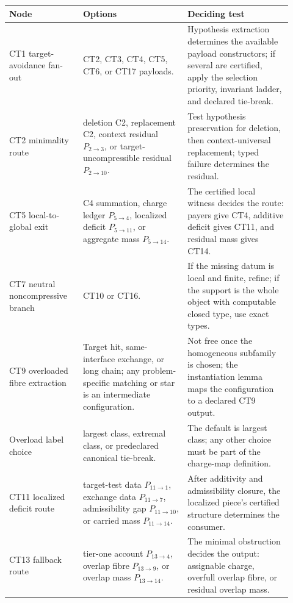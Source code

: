 \documentclass[
  11pt,
]{article}
\theoremstyle{definition}
\begin{document}
\begingroup
\small
\setlength{\tabcolsep}{2pt}
\begin{longtable}[]{@{}
  >{\raggedright\arraybackslash}p{0.24\linewidth}
  >{\raggedright\arraybackslash}p{0.34\linewidth}
  >{\raggedright\arraybackslash}p{0.34\linewidth}@{}}
\toprule\noalign{}
Node & Options & Deciding test \\
\midrule\noalign{}
\endhead
\bottomrule\noalign{}
\endlastfoot
CT1 target-avoidance fan-out & CT2, CT3, CT4, CT5, CT6, or CT17 payloads. & Hypothesis extraction determines the available payload constructors; if several are certified, apply the selection priority, invariant ladder, and declared tie-break. \\
CT2 minimality route & deletion C2, replacement C2, context residual \(P_{2\to3}\), or target-uncompressible residual \(P_{2\to10}\). & Test hypothesis preservation for deletion, then context-universal replacement; typed failure determines the residual. \\
CT5 local-to-global exit & C4 summation, charge ledger \(P_{5\to4}\), localized deficit \(P_{5\to11}\), or aggregate mass \(P_{5\to14}\). & The certified local witness decides the route: payers give CT4, additive deficit gives CT11, and residual mass gives CT14. \\
CT7 neutral noncompressive branch & CT10 or CT16. & If the missing datum is local and finite, refine; if the support is the whole object with computable closed type, use exact types. \\
CT9 overloaded fibre extraction & Target hit, same-interface exchange, or long chain; any problem-specific matching or star is an intermediate configuration. & Not free once the homogeneous subfamily is chosen; the instantiation lemma maps the configuration to a declared CT9 output. \\
Overload label choice & largest class, extremal class, or predeclared canonical tie-break. & The default is largest class; any other choice must be part of the charge-map definition. \\
CT11 localized deficit route & target-test data \(P_{11\to1}\), exchange data \(P_{11\to7}\), admissibility gap \(P_{11\to10}\), or carried mass \(P_{11\to14}\). & After additivity and admissibility closure, the localized piece's certified structure determines the consumer. \\
CT13 fallback route & tier-one account \(P_{13\to4}\), overlap fibre \(P_{13\to9}\), or overlap mass \(P_{13\to14}\). & The minimal obstruction decides the output: assignable charge, overfull overlap fibre, or residual overlap mass. \\

\end{longtable}
\end{document}

